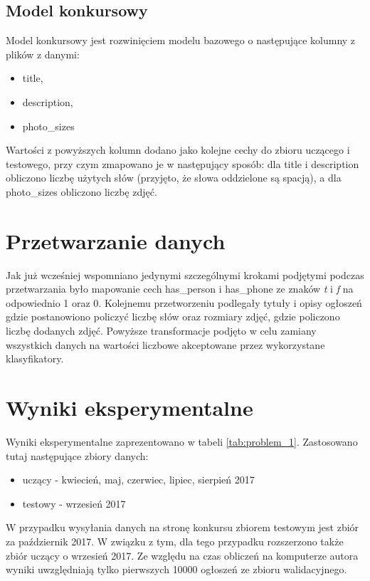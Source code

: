 \documentclass[a4paper,11pt]{article}
\begin{document}
\subsection{Model konkursowy}

Model konkursowy jest rozwinięciem modelu bazowego o następujące kolumny z plików z danymi:
\begin{itemize}
\item title,
\item description,
\item photo\_sizes
\end{itemize}

Wartości z powyższych kolumn dodano jako kolejne cechy do zbioru uczącego i testowego, przy czym zmapowano je w następujący sposób: dla title i description obliczono liczbę użytych słów (przyjęto, że słowa oddzielone są spacją), a dla photo\_sizes obliczono liczbę zdjęć.

\section{Przetwarzanie danych}

Jak już wcześniej wspomniano jedynymi szczególnymi krokami podjętymi podczas przetwarzania było mapowanie cech has\_person i has\_phone ze znaków \textit{t} i \textit{f} na odpowiednio 1 oraz 0. Kolejnemu przetworzeniu podlegały tytuły i opisy ogłoszeń gdzie postanowiono policzyć liczbę słów oraz rozmiary zdjęć, gdzie policzono liczbę dodanych zdjęć. Powyższe transformacje podjęto w celu zamiany wszystkich danych na wartości liczbowe akceptowane przez wykorzystane klasyfikatory.

\section{Wyniki eksperymentalne}

Wyniki eksperymentalne zaprezentowano w tabeli \ref{tab:problem_1}. Zastosowano tutaj następujące zbiory danych:
\begin{itemize}
\item uczący - kwiecień, maj, czerwiec, lipiec, sierpień 2017
\item testowy - wrzesień 2017
\end{itemize}

W przypadku wysyłania danych na stronę konkursu zbiorem testowym jest zbiór za październik 2017. W związku z tym, dla tego przypadku rozszerzono także zbiór uczący o wrzesień 2017. Ze względu na czas obliczeń na komputerze autora wyniki uwzględniają tylko pierwszych 10000 ogłoszeń ze zbioru walidacyjnego.
\end{document}
